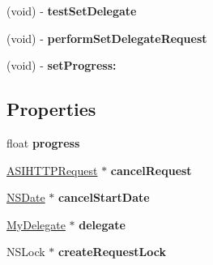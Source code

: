 \begin{DoxyCompactItemize}
\item 
\hypertarget{interface_stress_tests_a2232ea378810aa470eeef857a8c8a4f9}{
(void) -\/ {\bfseries test\-Set\-Delegate}}
\label{interface_stress_tests_a2232ea378810aa470eeef857a8c8a4f9}

\item 
\hypertarget{interface_stress_tests_a86c6b6b048544a8c8b7b6ed55c5ed78f}{
(void) -\/ {\bfseries perform\-Set\-Delegate\-Request}}
\label{interface_stress_tests_a86c6b6b048544a8c8b7b6ed55c5ed78f}

\item 
\hypertarget{interface_stress_tests_a5c7aa892b2e1ae907f42c09b09bf03c0}{
(void) -\/ {\bfseries set\-Progress\-:}}
\label{interface_stress_tests_a5c7aa892b2e1ae907f42c09b09bf03c0}

\end{DoxyCompactItemize}
\subsection*{\-Properties}
\begin{DoxyCompactItemize}
\item 
\hypertarget{interface_stress_tests_a8a9d0d2ad8eaf828ca6350a9f024f8ab}{
float {\bfseries progress}}
\label{interface_stress_tests_a8a9d0d2ad8eaf828ca6350a9f024f8ab}

\item 
\hypertarget{interface_stress_tests_af826daab43ccdd4b8bae5d9ac5126ee4}{
\hyperlink{interface_a_s_i_h_t_t_p_request}{\-A\-S\-I\-H\-T\-T\-P\-Request} $\ast$ {\bfseries cancel\-Request}}
\label{interface_stress_tests_af826daab43ccdd4b8bae5d9ac5126ee4}

\item 
\hypertarget{interface_stress_tests_ac574816e638db0a94cffc0189baebcdb}{
\hyperlink{class_n_s_date}{\-N\-S\-Date} $\ast$ {\bfseries cancel\-Start\-Date}}
\label{interface_stress_tests_ac574816e638db0a94cffc0189baebcdb}

\item 
\hypertarget{interface_stress_tests_a4f3bbf69ee74255ca27f501ac8d4a25a}{
\hyperlink{interface_my_delegate}{\-My\-Delegate} $\ast$ {\bfseries delegate}}
\label{interface_stress_tests_a4f3bbf69ee74255ca27f501ac8d4a25a}

\item 
\hypertarget{interface_stress_tests_a95fa5c4925a96d71264303a7264f6a03}{
\-N\-S\-Lock $\ast$ {\bfseries create\-Request\-Lock}}
\label{interface_stress_tests_a95fa5c4925a96d71264303a7264f6a03}

\end{DoxyCompactItemize}


